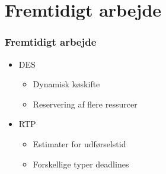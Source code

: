 \documentclass[12pt]{beamer}
\begin{document}
\section{Fremtidigt arbejde}
\begin{frame}
  	\frametitle{Fremtidigt arbejde}
\begin{itemize}
\item DES
	\begin{itemize}
	\item Dynamisk køskifte
	\item Reservering af flere ressurcer
	\end{itemize}
\item RTP
	\begin{itemize}
	\item Estimater for udførselstid
	\item Forskellige typer deadlines
	\end{itemize}
\end{itemize}
\end{frame}






\end{document}
